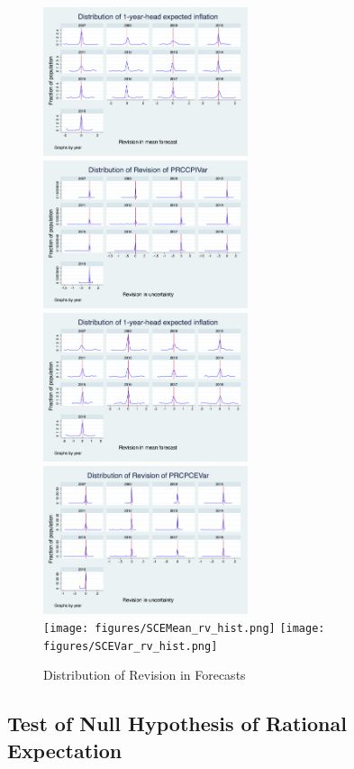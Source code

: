 \documentclass[]{article}
\begin{document}
\begin{figure}[h]\label{RevisionHist}
	\centering
	\includegraphics[width=6cm]{figures/PRCCPIMean_rv_hist.png} 
	\includegraphics[width=6cm]{figures/PRCCPIVar_rv_hist.png}  \\
	\smallskip
	\includegraphics[width=6cm]{figures/PRCPCEMean_rv_hist.png} 
	\includegraphics[width=6cm]{figures/PRCPCEVar_rv_hist.png}  \\
	\smallskip
		\texttt{[image: figures/SCEMean\_rv\_hist.png]} 
	\texttt{[image: figures/SCEVar\_rv\_hist.png]}  \\
	\caption{Distribution of Revision in Forecasts}
\end{figure}

\subsection{Test of Null Hypothesis of Rational Expectation}
\end{document}
